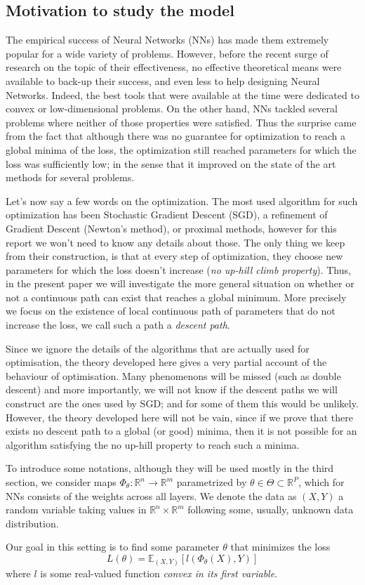 \documentclass[11pt]{article} %
\begin{document}
\subsection{Motivation to study the model}
	The empirical success of Neural Networks (NNs) has made them extremely popular for a wide variety of problems. However, before the recent surge of research on the topic of their effectiveness, no effective theoretical means were available to back-up their success, and even less to help designing Neural Networks. Indeed, the best tools that were available at the time were dedicated to convex or low-dimensional problems. On the other hand, NNs tackled several problems where neither of those properties were satisfied. Thus the surprise came from the fact that although there was no guarantee for optimization to reach a global minima of the loss, the optimization still reached parameters for which the loss was sufficiently low; in the sense that it improved on the state of the art methods for several problems. 
\par
 Let's now say a few words on the optimization.  The most used algorithm for such optimization has been Stochastic Gradient Descent (SGD), a refinement of Gradient Descent (Newton's method), or proximal methods, however for this report we won't need to know any details about those. The only thing we keep from their construction, is that at every step of optimization, they choose new parameters for which the loss doesn't increase (\emph{no up-hill climb property}). Thus, in the present paper we will investigate the more general situation on whether or not a continuous path can exist that reaches a global minimum. More precisely we focus on the existence of local continuous path of parameters that do not increase the loss, we call such a path a \emph{descent path}.
\par
Since we ignore the details of the algorithms that are actually used for optimisation, the theory developed here gives a very partial account of the behaviour of optimisation. Many phenomenons will be missed (such as double descent) and more importantly, we will not know if the descent paths we will construct are the ones used by SGD; and for some of them this would be unlikely. However, the theory developed here will not be vain, since if we prove that there exists no descent path to a global (or good) minima, then it is not possible for an algorithm satisfying the no up-hill property to reach such a minima.
	\par
	To introduce some notations, although they will be used mostly in the third section, we consider maps $\Phi_\theta : \mathbb{R}^n\to \mathbb{R}^m$ parametrized by $\theta \in \Theta \subset \mathbb{R}^P$, which for NNs consists of the weights across all layers. We denote the data as $(X,Y)$ a random variable taking values in $\mathbb{R}^n\times\mathbb{R}^m$ following some, usually, unknown data distribution.
	\par
	Our goal in this setting is to find some parameter $\theta$ that minimizes the loss
	\begin{equation*}
		L(\theta) = \mathbb{E}_{(X,Y)}[l(\Phi_\theta(X), Y)]
	\end{equation*}
	where $l$ is some real-valued function \emph{convex in its first variable}. 
\end{document}

